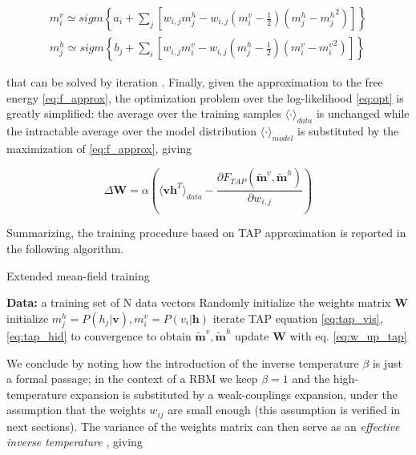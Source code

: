 \documentclass{revtex4-1}
\begin{document}
\begin{align}
m_i^v \simeq sigm \left\{ a_i + \sum_j \left[ w_{i,j} m_j^h - w_{i,j} \left( m_i^v - \frac{1}{2} \right) \left( m_j^h - {m_j^h}^2 \right) \right] \right\} \label{eq:tap_vis} \\
m_j^h \simeq sigm \left\{ b_j + \sum_i \left[ w_{i,j} m_i^v - w_{i,j} \left( m_j^h - \frac{1}{2} \right) \left( m_i^v - {m_i^v}^2 \right) \right] \right\} \label{eq:tap_hid}
\end{align}

that can be solved by iteration \cite{conv}. Finally, given the approximation to the free energy \eqref{eq:f_approx}, the optimization problem over the log-likelihood \eqref{eq:opt} is greatly simplified: the average over the training samples \(\textstyle \langle \cdot \rangle_{data}\) is unchanged while the intractable average over the model distribution \(\textstyle \langle \cdot \rangle_{model}\) is substituted by the maximization of \eqref{eq:f_approx}, giving

\begin{equation}
\Delta \mathbf{W} = \alpha \left( \langle \mathbf{v h}^T \rangle_{data} - \frac{\partial F_{TAP}(\mathbf{\tilde{m}}^v, \mathbf{\tilde{m}}^h)}{\partial w_{i,j}} \right)
\label{eq:w_up_tap}
\end{equation}

Summarizing, the training procedure based on TAP approximation is reported in the following algorithm.

\begin{algorithm}[H]
\caption{Extended mean-field training}\label{alg:tap}
\begin{algorithmic}[1]
\State \textbf{Data:} a training set of N data vectors
\State Randomly initialize the weights matrix \textbf{W}
    \State initialize  \(m_j^h=P(h_j|\mathbf{v}),m_i^v=P(v_i|\mathbf{h})\)
    \State iterate TAP equation \eqref{eq:tap_vis},\eqref{eq:tap_hid} to convergence to obtain \(\tilde{\mathbf{m}}^v,\tilde{\mathbf{m}}^h\)
    \State update \(\mathbf{W}\) with eq. \eqref{eq:w_up_tap}
  \EndFor
\EndFor
\end{algorithmic}
\end{algorithm}

We conclude by noting how the introduction of the inverse temperature \(\beta\) is just a formal passage; in the context of a RBM we keep \(\beta = 1\) and the high-temperature expansion is substituted by a weak-couplings expansion, under the assumption that the weights \(w_{ij}\) are small enough (this assumption is verified in next sections). The variance of the weights matrix can then serve as an \textit{effective inverse temperature} \cite{monasson}, giving
\end{document}
